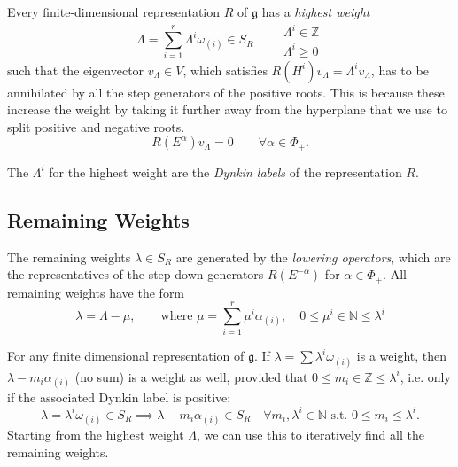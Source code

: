 Every finite-dimensional representation $R$  of $\mathfrak{g}$  has a \emph{highest weight} 
\begin{equation}
  \Lambda = \sum_{i=1}^{r} \Lambda^{i} \omega_{(i)} \in S_R \qquad 
  \begin{gathered}
    \Lambda^{i} \in \mathbb{Z} \\
    \Lambda^{i} \geq 0
  \end{gathered}
\end{equation}
such that the eigenvector $v_{\Lambda} \in V$, which satisfies $R(H^{i}) v_{\Lambda} = \Lambda^{i} v_{\Lambda}$, has to be annihilated by all the step generators of the positive roots. This is because these increase the weight by taking it further away from the hyperplane that we use to split positive and negative roots.
\begin{equation}
  R(E^{\alpha}) v_{\Lambda} = 0 \qquad \forall\alpha \in \Phi_{+}.
\end{equation}

\begin{definition}[]
  The $\Lambda^{i}$ for the highest weight are the \emph{Dynkin labels} of the representation $R$.
\end{definition}

\subsection*{Remaining Weights}%

The remaining weights $\lambda \in S_R$ are generated by the \emph{lowering operators}, which are the representatives of the step-down generators $R(E^{-\alpha})$ for $\alpha \in \Phi_{+}$.
All remaining weights have the form
\begin{equation}
  \lambda = \Lambda - \mu, \qquad \text{where } \mu = \sum_{i=1}^{r}\mu^{i} \alpha_{(i)}, \quad 0 \leq \mu^{i} \in \mathbb{N} \leq \lambda^{i}
\end{equation}

For any finite dimensional representation of $\mathfrak{g}$.
If $\lambda = \sum \lambda^{i} \omega_{(i)}$ is a weight, then $\lambda - m_i \alpha_{(i)}$ (no sum) is a weight as well, provided that $0 \leq m_i \in \mathbb{Z} \leq \lambda^{i}$, i.e. only if the associated Dynkin label is positive:
\begin{equation}
  \boxed{\lambda = \lambda^{i} \omega_{(i)} \in S_R \implies \lambda - m_i \alpha_{(i)} \in S_R \quad \forall m_i, \lambda^{i} \in \mathbb{N} \text{ s.t. } 0 \leq m_i \leq \lambda^{i}.}
\end{equation}
Starting from the highest weight $\Lambda$, we can use this to iteratively find all the remaining weights.

